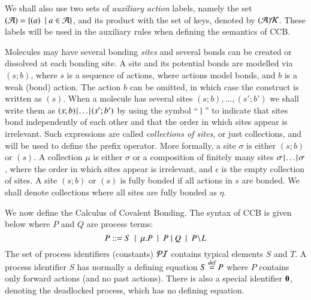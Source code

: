 We shall also use two sets of \emph{auxiliary action} labels, namely the set $(\mathcal{A}) =\{ (a)\ \mid a\in\mathcal{A}\}$, and its product with the set of keys, denoted by $(\mathcal{A})\mathcal{K}$. These labels will be used in the auxiliary rules when defining
the semantics of CCB.

Molecules may have several bonding \emph{sites} and several bonds can be created or dissolved at each bonding site. A site and its potential bonds are modelled via $(s;b)$, where $s$ is a sequence of actions, where actions model bonds, and $b$ is a weak (bond) action. The action $b$ can be omitted, in which case the construct is written as $(s)$. When a molecule has several sites 
$(s;b), \ldots,(s';b')$ we shall write them as $(s;b) \!\mid\!  \ldots \!\mid\! (s';b')$ by using the symbol ``$\; \vert \;$'' to indicate that sites bond independently of each other and that the order in which sites appear is irrelevant. Such expressions are called \emph{collections of sites}, or just collections, and will be used to define the prefix operator. More formally, a site $\sigma$
is either $(s;b)$ or $(s)$. A collection $\mu$ is either 
$\sigma$ or a composition of finitely many sites $\sigma\!\mid\!\ldots\!\mid\! \sigma$, where the order in which sites appear is irrelevant,
and $\epsilon$ is the empty collection of sites. 
A site $(s;b)$ or $(s)$ is fully bonded if all actions in $s$ are bonded. 
We shall denote collections where all sites are fully bonded as $\eta$.

We now define the Calculus of Covalent Bonding. The syntax of CCB is given 
below where $P$ and $Q$ are process terms:
$$P ::=  S \ \mid \ \mu.P \ \mid \ P\; \vert \; Q \ \mid \ P\!\setminus\!L $$
%
The set of process identifiers (constants) $\mathcal{PI}$ contains typical elements $S$ and $T$. 
A process identifier $S$ has normally a defining equation $S\stackrel{\emph{def}}{=} P$ where $P$ contains only forward 
actions (and no past actions). There is also a special identifier
 $\mathbf{0}$, denoting the deadlocked process, which has no defining equation.

